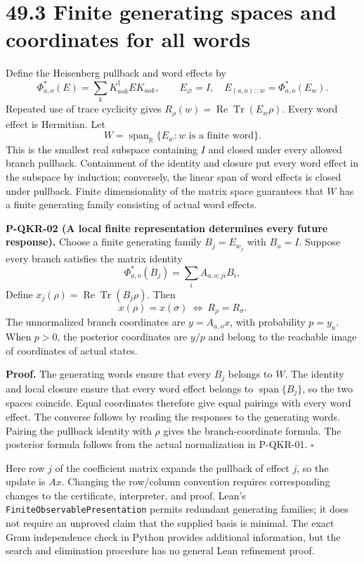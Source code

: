 \documentclass[
  11pt,
  oneside]{book}
\begin{document}
\section{49.3 Finite generating spaces and coordinates for all words}

Define the Heisenberg pullback and word effects by \[
\Phi_{a,o}^*(E)=\sum_kK_{aok}^{\dagger}EK_{aok},\qquad
E_{\varnothing}=I,\quad E_{(a,o)::w}=\Phi_{a,o}^*(E_w).
\] Repeated use of trace cyclicity gives
\(R_\rho(w)=\operatorname{Re}\operatorname{Tr}(E_w\rho)\). Every word
effect is Hermitian. Let \[
W=\operatorname{span}_{\mathbb R}\{E_w:w\text{ is a finite word}\}.
\] This is the smallest real subspace containing \(I\) and closed under
every allowed branch pullback. Containment of the identity and closure
put every word effect in the subspace by induction; conversely, the
linear span of word effects is closed under pullback. Finite
dimensionality of the matrix space guarantees that \(W\) has a finite
generating family consisting of actual word effects.

\label{p-qkr-02}{}

\textbf{P-QKR-02 (A local finite representation determines every future
response).} Choose a finite generating family \(B_j=E_{w_j}\) with
\(B_u=I\). Suppose every branch satisfies the matrix identity \[
\Phi_{a,o}^*(B_j)=\sum_i A_{a,o;ji}B_i,
\] Define \(x_j(\rho)=\operatorname{Re}\operatorname{Tr}(B_j\rho)\).
Then \[
x(\rho)=x(\sigma)\ \Longleftrightarrow\ R_\rho=R_\sigma.
\] The unnormalized branch coordinates are \(y=A_{a,o}x\), with
probability \(p=y_u\). When \(p>0\), the posterior coordinates are
\(y/p\) and belong to the reachable image of coordinates of actual
states.

\textbf{Proof.} The generating words ensure that every \(B_j\) belongs
to \(W\). The identity and local closure ensure that every word effect
belongs to \(\operatorname{span}\{B_j\}\), so the two spaces coincide.
Equal coordinates therefore give equal pairings with every word effect.
The converse follows by reading the responses to the generating words.
Pairing the pullback identity with \(\rho\) gives the branch-coordinate
formula. The posterior formula follows from the actual normalization in
P-QKR-01. \(\square\)

Here row \(j\) of the coefficient matrix expands the pullback of effect
\(j\), so the update is \(Ax\). Changing the row/column convention
requires corresponding changes to the certificate, interpreter, and
proof. Lean's \texttt{Finite\allowbreak Observable\allowbreak Presentation} permits redundant
generating families; it does not require an unproved claim that the
supplied basis is minimal. The exact Gram independence check in Python
provides additional information, but the search and elimination
procedure has no general Lean refinement proof.
\end{document}
